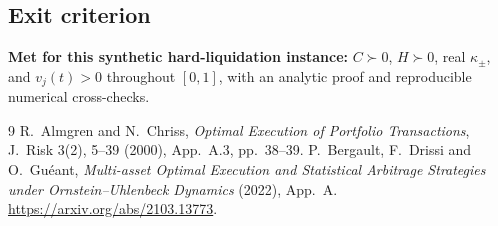 \documentclass[11pt,a4paper]{article}
\begin{document}
\subsection*{Exit criterion}

\textbf{Met for this synthetic hard-liquidation instance:} $C\succ0$,
$H\succ0$, real $\kappa_\pm$, and $v_j(t)>0$ throughout $[0,1]$, with an
analytic proof and reproducible numerical cross-checks.


\begin{thebibliography}{9}
 R.~Almgren and N.~Chriss,
\emph{Optimal Execution of Portfolio Transactions}, J.~Risk 3(2), 5--39
(2000), App.~A.3, pp.~38--39.
 P.~Bergault, F.~Drissi and O.~Gu\'eant,
\emph{Multi-asset Optimal Execution and Statistical Arbitrage Strategies
under Ornstein--Uhlenbeck Dynamics} (2022), App.~A.
\url{https://arxiv.org/abs/2103.13773}.
\end{thebibliography}
\end{document}
